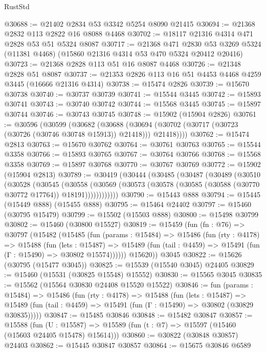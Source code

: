 \begin{lexlean}{RustStd}
\begin{coremodule}
@30688 := @21402 @2834 @53 @3342 @5254 @8090 @21415
@30694 := @21368 @2832 @113 @2822 @16 @8088 @4468
@30702 := @18117 @21316 @4314 @471 @2828 @53 @51 @5324 @8087
@30717 := @21368
    @471
    @2830
    @53
    @3269
    @5324
    (@11381 @4468)
    (@15860 @21316 @4314 @53 @470 @5324 @20412 @20416)
@30723 := @21368 @2828 @113 @51 @16 @8087 @4468
@30726 := @21348 @2828 @51 @8087
@30737 := @21353 @2826 @113 @16 @51 @4453 @4468 @4259 @3445 (@16666 @21316 @4314)
@30738 := @15474 @2826
@30739 := @15670 @30738
@30740 := @30737 @30739
@30741 := @15544 @3445
@30742 := @15893 @30741
@30743 := @30740 @30742
@30744 := @15568 @3445
@30745 := @15897 @30744
@30746 := @30743 @30745
@30748 := @15902 (@15904 @2826)
@30761 := @30596
    (@30599
      (@30682
        (@30688 (@30694 (@30702 (@30717 (@30723 (@30726 (@30746 @30748 @15913)) @21418))) @21418))))
@30762 := @15474 @2813
@30763 := @15670 @30762
@30764 := @30761 @30763
@30765 := @15544 @3358
@30766 := @15893 @30765
@30767 := @30764 @30766
@30768 := @15568 @3358
@30769 := @15897 @30768
@30770 := @30767 @30769
@30772 := @15902 (@15904 @2813)
@30789 := @30419
    (@30444
      (@30485
        (@30487
          (@30489
            (@30510
              (@30528
                (@30545
                  (@30558
                    (@30569
                      (@30573 (@30578 (@30585 (@30588 (@30770 @30772 @17764)) @18191))))))))))))
@30790 := @15443 @888
@30794 := @15445 (@15449 @888) (@15455 @888)
@30795 := @15464 @24402
@30797 := @15460 (@30795 @15479)
@30799 := @15502 (@15503 @888)
@30800 := @15498 @30799
@30802 := @15460 (@30800 @15527)
@30819 := @15459
    (fun (fn : @76) =>
    @30797
      (@15482
        (@15485
          (fun (params : @15484) =>
          @15486
            (fun (rty : @4178) =>
            @15488
              (fun (lets : @15487) =>
              @15489 (fun (tail : @4459) => @15491 (fun (Γ : @15490) => @30802 @15574))))))
        @15620))
    @3045
@30822 := @15626 (@30795 (@15477 @3045))
@30825 := @15539 (@15540 @3045) @24405
@30829 := @15460 (@15531 (@30825 @15548) @15552)
@30830 := @15565 @3045
@30835 := @15562 (@15564 @30830 @24408 @15520 @15522)
@30846 := fun (params : @15484) =>
  @15486
    (fun (rty : @4178) =>
    @15488
      (fun (lets : @15487) =>
      @15489 (fun (tail : @4459) => @15491 (fun (Γ : @15490) => @30802 (@30829 @30835)))))
@30847 := @15485 @30846
@30848 := @15482 @30847
@30857 := @15588
    (fun (U : @15587) => @15589 (fun (t : @7) => @15597 (@15460 (@15603 @24405 @15478) @15614)))
@30860 := @30822 (@30848 @30857) @24403
@30862 := @15445 @30847 @30857
@30864 := @15675 @30846 @6589

\end{coremodule}
\end{lexlean}
